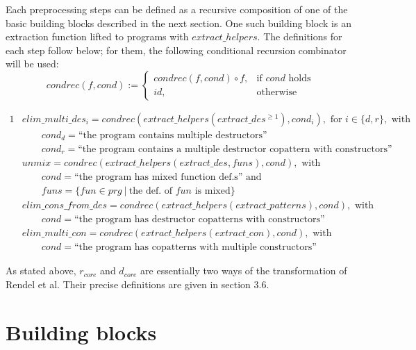 Each preprocessing steps can be defined as a recursive composition of one of the basic building blocks described in the next section. One such building block is an extraction function lifted to programs with $extract\_helpers$. The definitions for each step follow below; for them, the following conditional recursion combinator will be used:
\[
    condrec(f, cond) :=
\begin{cases}
    condrec(f, cond) \circ f,& \text{if $cond$ holds} \\
   id,& \text{otherwise}
\end{cases}
\]

\begin{framed}

\begin{alignat*}{1}
&elim\_multi\_des_i = condrec(extract\_helpers(extract\_des^{\geq 1}), cond_i), \textrm{ for } i \in \{d, r\}, \textrm{ with } \\
&\qquad cond_d = \textrm{``the program contains multiple destructors''} \\
&\qquad cond_r = \textrm{``the program contains a multiple destructor copattern with constructors''} \\
&unmix = condrec(extract\_helpers(extract\_des, funs), cond), \textrm{ with}\\
&\qquad cond = \textrm{``the program has mixed function def.s'' and} \\
&\qquad funs = \{ fun \in prg ~ | ~ \textrm{the def. of $fun$ is mixed} \} \\
&elim\_cons\_from\_des = condrec(extract\_helpers(extract\_patterns), cond), \textrm{ with}\\
&\qquad cond = \textrm{``the program has destructor copatterns with constructors''} \\
&elim\_multi\_con = condrec(extract\_helpers(extract\_con), cond), \textrm{ with}\\
&\qquad cond = \textrm{``the program has copatterns with multiple constructors''}
\end{alignat*}

\end{framed}

As stated above, $r_{core}$ and $d_{core}$ are essentially two ways of the transformation of Rendel et al. Their precise definitions are given in section 3.6.

\section{Building blocks}

